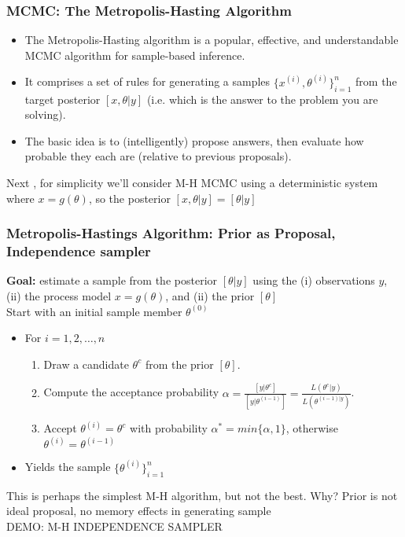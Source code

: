 \documentclass{beamer}
\begin{document}
\frame%
{\frametitle{MCMC: The Metropolis-Hasting Algorithm}

\begin{itemize}
\pause
\item
The Metropolis-Hasting algorithm is a popular, effective,  and understandable MCMC algorithm for sample-based inference.
\pause
\item 
It comprises a set of rules for generating a samples $\{ x^{(i)}, \theta^{(i)} \}_{i=1}^n$ from the target posterior $[x, \theta | y]$ (i.e. which is the answer to the problem you are solving).
\pause
\item
The basic idea is to (intelligently) propose answers, then evaluate how probable they each are (relative to previous proposals). 

\end{itemize}

\pause
Next , for simplicity we'll consider M-H MCMC using a deterministic system where $x = g(\theta)$, so the posterior $ [x,\theta | y] = [\theta | y]$
}

\frame
{ \frametitle{Metropolis-Hastings Algorithm: Prior as Proposal, Independence sampler}

\small 
\textbf{Goal:} estimate a sample from the posterior $[\theta | y]$ using the (i) observations $y$, (ii) the process model $x = g(\theta)$, and (ii) the prior $[ \theta ]$ \\ 
Start with an initial sample member $\theta^{(0)} $ 
\pause
\begin{itemize}	
		\item For $i=1,2,\dots,n$
		\begin{enumerate}
			\item Draw a candidate $\theta^c$ from the prior $ [\theta] $.
			\item Compute the acceptance probability $\alpha= \frac{[y|\theta^c]}{[y|\theta^{(i-1)}]} = \frac{L(\theta^c | y)}{L(\theta^{(i-1) | y})}$. 
			\item Accept $\theta^{(i)} = \theta^c$ with probability $\alpha^*=min\{\alpha,1\}$, otherwise $\theta^{(i)} = \theta^{(i-1)}$
		\end{enumerate} 
\pause
		\item Yields the sample $ \{ \theta^{(i)} \}_{i=1}^n $ 
\end{itemize}

\pause
This is perhaps the simplest M-H algorithm, but not the best. Why? \pause Prior is not ideal proposal, no memory effects in generating sample \\

\pause
\medskip
\color{red} DEMO: M-H INDEPENDENCE SAMPLER 

}
\end{document}

